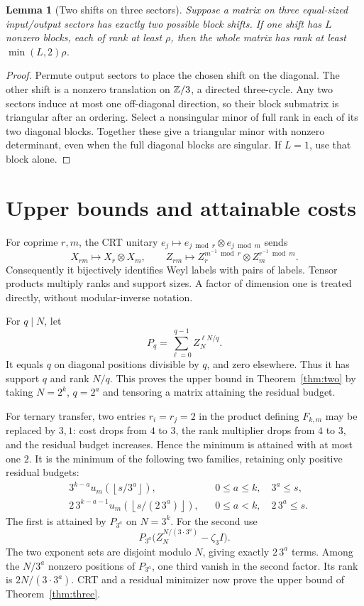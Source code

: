 \documentclass[11pt,a4paper]{article}
\newtheorem{lemma}[theorem]{Lemma}
\theoremstyle{remark}\newtheorem{remark}[theorem]{Remark}
\newcommand{\fl}[1]{\left\lfloor #1\right\rfloor}
\begin{document}
\begin{lemma}[Two shifts on three sectors]\label{lem:cycle}
Suppose a matrix on three equal-sized input/output sectors has exactly
two possible block shifts. If one shift has $L$ nonzero blocks, each of
rank at least $\rho$, then the whole matrix has rank at least
$\min(L,2)\rho$.
\end{lemma}
\begin{proof}
Permute output sectors to place the chosen shift on the diagonal. The
other shift is a nonzero translation on $\mathbb Z/3$, a directed three-cycle.
Any two sectors induce at most one off-diagonal direction, so their
block submatrix is triangular after an ordering. Select a nonsingular
minor of full rank in each of its two diagonal blocks. Together these
give a triangular minor with nonzero determinant, even when the full
diagonal blocks are singular. If $L=1$, use that block alone.
\end{proof}

\section{Upper bounds and attainable costs}
For coprime $r,m$, the CRT unitary $e_j\mapsto e_{j\bmod r}\otimes
e_{j\bmod m}$ sends
\[
 X_{rm}\mapsto X_r\otimes X_m,\qquad
 Z_{rm}\mapsto Z_r^{m^{-1}\bmod r}\otimes Z_m^{r^{-1}\bmod m}.
\]
Consequently it bijectively identifies Weyl labels with pairs of labels.
Tensor products multiply ranks and support sizes. A factor of dimension
one is treated directly, without modular-inverse notation.

For $q\mid N$, let
\[
 P_q=\sum_{\ell=0}^{q-1}Z_N^{\ell N/q}.
\]
It equals $q$ on diagonal positions divisible by $q$, and zero elsewhere.
Thus it has support $q$ and rank $N/q$. This proves the upper bound in
Theorem~\ref{thm:two} by taking $N=2^k$, $q=2^a$ and tensoring a
matrix attaining the residual budget.

For ternary transfer, two entries $r_i=r_j=2$ in the product defining
$F_{k,m}$ may be replaced by $3,1$: cost drops from $4$ to $3$, the rank
multiplier drops from $4$ to $3$, and the residual budget increases.
Hence the minimum is attained with at most one $2$. It is the minimum
of the following two families, retaining only positive residual budgets:
\begin{align*}
 &3^{k-a}u_m(\fl{s/3^a}),&&0\le a\le k,\quad3^a\le s,\\
 &2\,3^{k-a-1}u_m(\fl{s/(2\,3^a)}),
       &&0\le a<k,\quad2\,3^a\le s .
\end{align*}
The first is attained by $P_{3^a}$ on $N=3^k$. For the second use
\[
 P_{3^a}\bigl(Z_N^{N/(3\cdot3^a)}-\zeta_3 I\bigr).
\]
The two exponent sets are disjoint modulo $N$, giving exactly $2\,3^a$
terms. Among the $N/3^a$ nonzero positions of $P_{3^a}$, one third
vanish in the second factor. Its rank is $2N/(3\cdot3^a)$.
CRT and a residual minimizer now prove the upper bound of
Theorem~\ref{thm:three}.
\end{document}
